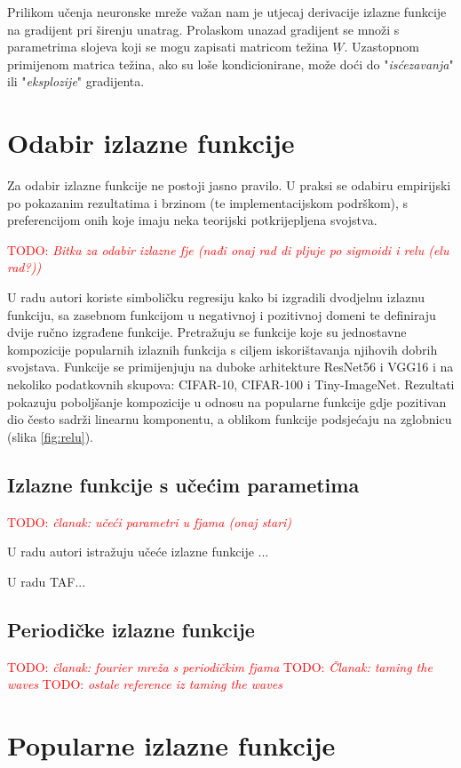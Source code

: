 \documentclass[times, utf8, diplomski]{fer}
\def\mat#1{\underline{#1}}
\def\figref#1{(slika \ref{#1})}
\def\TODO#1{\noindent\textcolor{red}{TODO: \textit{#1}}\newline}
\def\todo#1{\TODO{#1}}
\begin{document}
Prilikom učenja neuronske mreže važan nam je utjecaj derivacije izlazne funkcije na gradijent pri širenju unatrag. Prolaskom unazad gradijent se množi s parametrima slojeva koji se mogu zapisati matricom težina $\mat{W}$. Uzastopnom primijenom matrica težina, ako su loše kondicionirane, može doći do "\textit{isćezavanja}" ili "\textit{eksplozije}" gradijenta.

\section{Odabir izlazne funkcije}
Za odabir izlazne funkcije ne postoji jasno pravilo. U praksi se odabiru empirijski po pokazanim rezultatima i brzinom (te implementacijskom podrškom), s preferencijom onih koje imaju neka teorijski potkrijepljena svojstva.

\todo{Bitka za odabir izlazne fje (nađi onaj rad di pljuje po sigmoidi i relu (elu rad?))}

U radu \citet{elish} autori koriste simboličku regresiju kako bi izgradili dvodjelnu izlaznu funkciju, sa zasebnom funkcijom u negativnoj i pozitivnoj domeni te definiraju dvije ručno izgrađene funkcije. Pretražuju se funkcije koje su jednostavne kompozicije popularnih izlaznih funkcija s ciljem iskorištavanja njihovih dobrih svojstava. Funkcije se primijenjuju na duboke arhitekture ResNet56 i VGG16 i na nekoliko podatkovnih skupova: CIFAR-10, CIFAR-100 i Tiny-ImageNet. Rezultati pokazuju poboljšanje kompozicije u odnosu na popularne funkcije gdje pozitivan dio često sadrži linearnu komponentu, a oblikom funkcije podsjećaju na zglobnicu \figref{fig:relu}.

\subsection{Izlazne funkcije s učećim parametima}
\todo{članak: učeći parametri u fjama (onaj stari)}

U radu \citet{trained_func} autori istražuju učeće izlazne funkcije ...

U radu TAF...

\subsection{Periodičke izlazne funkcije}
\todo{članak: fourier mreža s periodičkim fjama}
\todo{Članak: taming the waves}
\todo{ostale reference iz taming the waves}

\section{Popularne izlazne funkcije}
\end{document}
